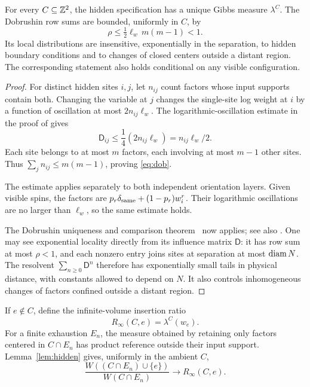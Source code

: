 \begin{lemma}\label{lem:hidden}
For every \(C\subseteq\mathbb Z^2\), the hidden specification has a unique Gibbs measure \(\lambda^C\). The Dobrushin row sums are bounded, uniformly in \(C\), by
\begin{equation}
 \rho\le\tfrac12\ell_w\,m(m-1)<1.
 \label{eq:dob}
\end{equation}
Its local distributions are insensitive, exponentially in the separation, to hidden boundary conditions and to changes of closed centers outside a distant region. The corresponding statement also holds conditional on any visible configuration.
\end{lemma}
\begin{proof}
For distinct hidden sites $i,j$, let $n_{ij}$ count factors whose input supports contain both. Changing the variable at $j$ changes the single-site log weight at $i$ by a function of oscillation at most $2n_{ij}\ell_w$. The logarithmic-oscillation estimate in the proof of \cite[Proposition 8.8]{Georgii} gives
\[
 \mathsf D_{ij}\le \frac14(2n_{ij}\ell_w)=n_{ij}\ell_w/2.
\]
Each site belongs to at most $m$ factors, each involving at most $m-1$ other sites. Thus $\sum_jn_{ij}\le m(m-1)$, proving \eqref{eq:dob}.

The estimate applies separately to both independent orientation layers. Given visible spins, the factors are \(p_r\delta_{\rm same}+(1-p_r)w_i^r\). Their logarithmic oscillations are no larger than \(\ell_w\), so the same estimate holds.

The Dobrushin uniqueness and comparison theorem~\cite{Dobrushin} now applies; see also \cite[Corollary 2.6]{Rebeschini}. One may see exponential locality directly from its influence matrix $\mathsf D$: it has row sum at most \(\rho<1\), and each nonzero entry joins sites at separation at most \(\operatorname{diam} N\). The resolvent \(\sum_{n\ge0}\mathsf D^n\) therefore has exponentially small tails in physical distance, with constants allowed to depend on \(N\). It also controls inhomogeneous changes of factors confined outside a distant region.
\end{proof}

If \(e\notin C\), define the infinite-volume insertion ratio
\begin{equation}
 R_\infty(C,e)=\lambda^C(w_e).
 \label{eq:Rinfty}
\end{equation}
For a finite exhaustion \(E_n\), the measure obtained by retaining only factors centered in \(C\cap E_n\) has product reference outside their input support. Lemma~\ref{lem:hidden} gives, uniformly in the ambient \(C\),
\begin{equation}
 \frac{W((C\cap E_n)\cup\{e\})}{W(C\cap E_n)}
 \longrightarrow R_\infty(C,e).
 \label{eq:finite-infinite-ratio}
\end{equation}


